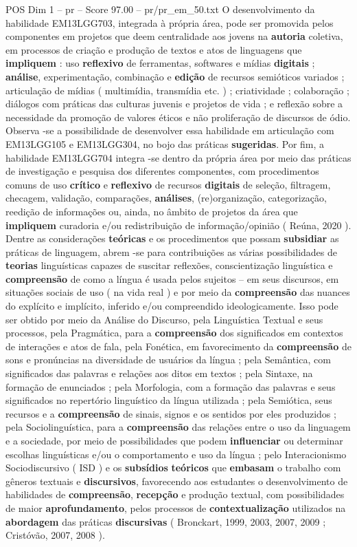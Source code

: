 \begin{textsample}{POS Dim 1 – pr – Score 97.00 – pr/pr\_em\_50.txt}
O desenvolvimento da habilidade EM13LGG703, integrada à própria área, pode ser promovida pelos componentes em projetos que deem centralidade aos jovens na \textbf{autoria} coletiva, em processos de criação e produção de textos e atos de linguagens que \textbf{impliquem} : uso \textbf{reflexivo} de ferramentas, softwares e mídias \textbf{digitais} ; \textbf{análise}, experimentação, combinação e \textbf{edição} de recursos semióticos variados ; articulação de mídias ( multimídia, transmídia etc. ) ; criatividade ; colaboração ; diálogos com práticas das culturas juvenis e projetos de vida ; e reflexão sobre a necessidade da promoção de valores éticos e não proliferação de discursos de ódio.
Observa -se a possibilidade de desenvolver essa habilidade em articulação com EM13LGG105 e EM13LGG304, no bojo das práticas \textbf{sugeridas}.
Por fim, a habilidade EM13LGG704 integra -se dentro da própria área por meio das práticas de investigação e pesquisa dos diferentes componentes, com procedimentos comuns de uso \textbf{crítico} e \textbf{reflexivo} de recursos \textbf{digitais} de seleção, filtragem, checagem, validação, comparações, \textbf{análises}, (re)organização, categorização, reedição de informações ou, ainda, no âmbito de projetos da área que \textbf{impliquem} curadoria e/ou redistribuição de informação/opinião ( Reúna, 2020 ).
Dentre as considerações \textbf{teóricas} e os procedimentos que possam \textbf{subsidiar} as práticas de linguagem, abrem -se para contribuições as várias possibilidades de \textbf{teorias} linguísticas capazes de suscitar reflexões, conscientização linguística e \textbf{compreensão} de como a língua é usada pelos sujeitos – em seus discursos, em situações sociais de uso ( na vida real ) e por meio da \textbf{compreensão} das nuances do explícito e implícito, inferido e/ou compreendido ideologicamente.
Isso pode ser obtido por meio da Análise do Discurso, pela Linguística Textual e seus processos, pela Pragmática, para a \textbf{compreensão} dos significados em contextos de interações e atos de fala, pela Fonética, em favorecimento da \textbf{compreensão} de sons e pronúncias na diversidade de usuários da língua ; pela Semântica, com significados das palavras e relações aos ditos em textos ; pela Sintaxe, na formação de enunciados ; pela Morfologia, com a formação das palavras e seus significados no repertório linguístico da língua utilizada ; pela Semiótica, seus recursos e a \textbf{compreensão} de sinais, signos e os sentidos por eles produzidos ; pela Sociolinguística, para a \textbf{compreensão} das relações entre o uso da linguagem e a sociedade, por meio de possibilidades que podem \textbf{influenciar} ou determinar escolhas linguísticas e/ou o comportamento e uso da língua ; pelo Interacionismo Sociodiscursivo ( ISD ) e os \textbf{subsídios} \textbf{teóricos} que \textbf{embasam} o trabalho com gêneros textuais e \textbf{discursivos}, favorecendo aos estudantes o desenvolvimento de habilidades de \textbf{compreensão}, \textbf{recepção} e produção textual, com possibilidades de maior \textbf{aprofundamento}, pelos processos de \textbf{contextualização} utilizados na \textbf{abordagem} das práticas \textbf{discursivas} ( Bronckart, 1999, 2003, 2007, 2009 ; Cristóvão, 2007, 2008 ).

\end{textsample}
